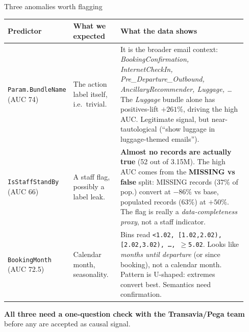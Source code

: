 \documentclass[aspectratio=169,11pt]{beamer}
\begin{document}
\begin{frame}{Three anomalies worth flagging}
  \scriptsize
  \begin{tabular}{@{}p{0.18\linewidth} p{0.20\linewidth} p{0.55\linewidth}@{}}
    \toprule
    \textbf{Predictor} & \textbf{What we expected} & \textbf{What the data shows} \\
    \midrule
    \texttt{Param.\linebreak BundleName} (AUC 74)
      & The action label itself, i.e.\ trivial.
      & It is the broader email context: \emph{BookingConfirmation, InternetCheckIn, Pre\_Departure\_Outbound, AncillaryRecommender, Luggage, \ldots} The \emph{Luggage} bundle alone has positives-lift $+261\%$, driving the high AUC. Legitimate signal, but near-tautological (``show luggage in luggage-themed emails''). \\[0.4em]
    \texttt{IsStaff\-StandBy} (AUC 66)
      & A staff flag, possibly a label leak.
      & \textbf{Almost no records are actually true} (52 out of 3.15M). The high AUC comes from the \textbf{MISSING vs false} split: MISSING records ($37\%$ of pop.) convert at $-86\%$ vs base, populated records ($63\%$) at $+50\%$. The flag is really a \emph{data-completeness proxy}, not a staff indicator. \\[0.4em]
    \texttt{Booking\-Month} (AUC 72.5)
      & Calendar month, seasonality.
      & Bins read \texttt{<1.02, [1.02,2.02), [2.02,3.02), \ldots, $\geq$5.02}. Looks like \emph{months until departure} (or since booking), not a calendar month. Pattern is U-shaped: extremes convert best. Semantics need confirmation. \\
    \bottomrule
  \end{tabular}

  \vspace{0.6em}
  \footnotesize
  \textbf{All three need a one-question check with the Transavia/Pega team} before any are accepted as causal signal.
\end{frame}
\end{document}
